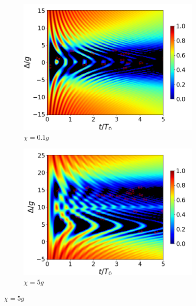 \begin{figure}[h]
    \centering
    \begin{subfigure}{0.49\textwidth}
        \includegraphics[width=\textwidth]{figuras/ch4/concu/delta/eg1+ge1 k=0.0g x=0.1g J=0.0g gamma=0.25g concu delta dis.png}
        \caption{$\chi=0.1g$}
        \label{fig4:concu detunning 1 x1}
    \end{subfigure}
    \hfill
    \begin{subfigure}{0.49\textwidth}
        \includegraphics[width=\textwidth]{figuras/ch4/concu/delta/eg1+ge1 k=0.0g x=5.0g J=0.0g gamma=0.25g concu delta dis.png}
        \caption{$\chi=5g$}
        \label{fig4:concu detunning 1 x2}
    \end{subfigure}

\end{figure}
